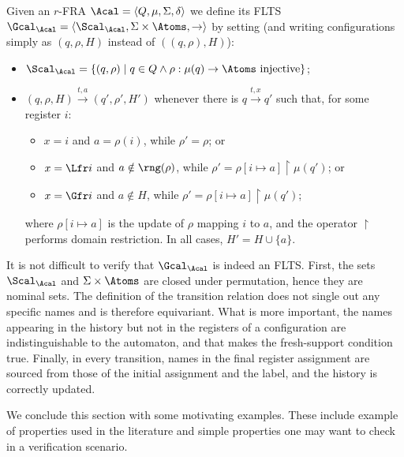 \begin{definition}
  Given an $r$-FRA $\Acal=\langle Q,\mu,\Sigma,\delta\rangle$ we define its FLTS $\Gcal_\Acal=\langle \Scal_\Acal,\Sigma\times\Atoms,\to\rangle$ by setting (and writing configurations simply as $(q,\rho,H)$ instead of $((q,\rho),H)$):
  \begin{itemize}
    \item 
$ \Scal_\Acal = \{(q,\rho)\mid q\in Q\land \rho:\mu(q)\to\Atoms\text{ injective}\}
$;
\item
  $(q,\rho,H)\xrightarrow{t,a}(q',\rho',H')$ whenever there is $q\xrightarrow{t,x}q'$ such that, for some register $i$:
  \begin{itemize}
    \item 
$x=i$ and $a=\rho(i)$, while $\rho'=\rho$; or
\item
$x=\Lfr i$ and $a\notin\rng(\rho)$, while $\rho'=\rho[i\mapsto a]\upharpoonright\mu(q')$; or
\item
$x=\Gfr i$ and $a\notin H$, while $\rho'=\rho[i\mapsto a]\upharpoonright\mu(q')$;
\end{itemize}
where $\rho[i\mapsto a]$ is the update of $\rho$ mapping $i$ to $a$, and the operator $\upharpoonright$ performs domain restriction. In all cases, $H'=H\cup\{a\}$.
\end{itemize}
\end{definition}

It is not difficult to verify that $\Gcal_\Acal$ is indeed an FLTS. First, the sets $\Scal_\Acal$ and $\Sigma\times\Atoms$ are closed under permutation, hence they are nominal sets. The definition of the transition relation does not single out any specific names and is therefore equivariant. What is more important, the names appearing in the history but not in the registers of a configuration are indistinguishable to the automaton, and that makes the fresh-support condition true. Finally, in every transition, names in the final register assignment are sourced from those of the initial assignment and the label, and the history is correctly updated.

We conclude this section with some motivating examples. These include example of properties used in the literature and simple properties one may want to check in a verification scenario.


